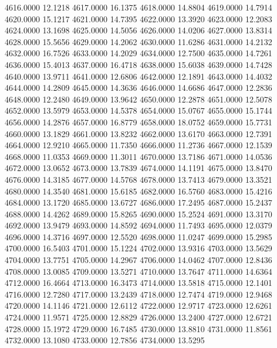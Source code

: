 4616.0000     12.1218
4617.0000     16.1375
4618.0000     14.8804
4619.0000     14.7914
4620.0000     15.1217
4621.0000     14.7395
4622.0000     13.3920
4623.0000     12.2083
4624.0000     13.1698
4625.0000     14.5056
4626.0000     14.0206
4627.0000     13.8314
4628.0000     15.5656
4629.0000     14.2062
4630.0000     11.6286
4631.0000     14.2132
4632.0000     16.7526
4633.0000     14.2029
4634.0000     12.7500
4635.0000     14.7261
4636.0000     15.4013
4637.0000     16.4718
4638.0000     15.6038
4639.0000     14.7428
4640.0000     13.9711
4641.0000     12.6806
4642.0000     12.1891
4643.0000     14.4032
4644.0000     14.2809
4645.0000     14.3636
4646.0000     14.6686
4647.0000     12.2836
4648.0000     12.2480
4649.0000     13.9642
4650.0000     12.2878
4651.0000     12.5078
4652.0000     13.5979
4653.0000     14.5378
4654.0000     15.0767
4655.0000     15.1744
4656.0000     14.2876
4657.0000     16.8779
4658.0000     18.0752
4659.0000     15.7731
4660.0000     13.1829
4661.0000     13.8232
4662.0000     13.6170
4663.0000     12.7391
4664.0000     12.9210
4665.0000     11.7350
4666.0000     11.2736
4667.0000     12.1539
4668.0000     11.0353
4669.0000     11.3011
4670.0000     13.7186
4671.0000     14.0536
4672.0000     13.0652
4673.0000     13.7839
4674.0000     14.1191
4675.0000     13.8470
4676.0000     14.3185
4677.0000     14.5768
4678.0000     13.7413
4679.0000     13.3521
4680.0000     14.3540
4681.0000     15.6185
4682.0000     16.5760
4683.0000     15.4216
4684.0000     13.1720
4685.0000     13.6727
4686.0000     17.2495
4687.0000     15.2437
4688.0000     14.4262
4689.0000     15.8265
4690.0000     15.2524
4691.0000     13.3170
4692.0000     13.9479
4693.0000     14.8592
4694.0000     11.7493
4695.0000     12.0379
4696.0000     14.3716
4697.0000     12.5520
4698.0000     11.0247
4699.0000     15.2985
4700.0000     16.5403
4701.0000     15.1224
4702.0000     13.9316
4703.0000     13.5629
4704.0000     13.7751
4705.0000     14.2967
4706.0000     14.0462
4707.0000     12.8436
4708.0000     13.0085
4709.0000     13.5271
4710.0000     13.7647
4711.0000     14.6364
4712.0000     16.4664
4713.0000     16.3473
4714.0000     13.5818
4715.0000     12.1401
4716.0000     12.7280
4717.0000     13.2439
4718.0000     12.7474
4719.0000     12.9468
4720.0000     14.1146
4721.0000     12.6112
4722.0000     12.9717
4723.0000     12.6261
4724.0000     11.9571
4725.0000     12.8829
4726.0000     13.2400
4727.0000     12.6721
4728.0000     15.1972
4729.0000     16.7485
4730.0000     13.8810
4731.0000     11.8561
4732.0000     13.1080
4733.0000     12.7856
4734.0000     13.5295
